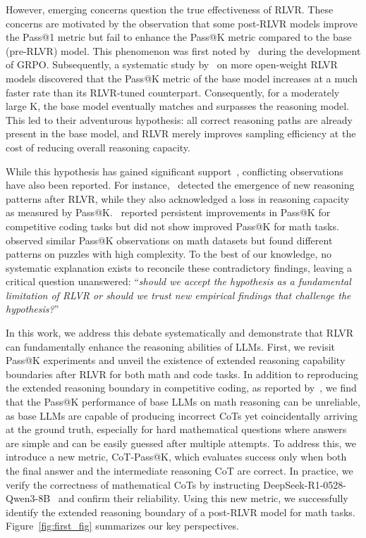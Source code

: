 However, emerging concerns question the true effectiveness of RLVR. These concerns are motivated by the observation that some post-RLVR models improve the Pass@1 metric but fail to enhance the Pass@K metric compared to the base (pre-RLVR) model. This phenomenon was first noted by~\cite{shao2024deepseekmath} during the development of GRPO. Subsequently, a systematic study by~\cite{yue2025RLVR_limit} on more open-weight RLVR models discovered that the Pass@K metric of the base model increases at a much faster rate than its RLVR-tuned counterpart. Consequently, for a moderately large K, the base model eventually matches and surpasses the reasoning model. This led to their adventurous hypothesis: all correct reasoning paths are already present in the base model, and RLVR merely improves sampling efficiency at the cost of reducing overall reasoning capacity.

While this hypothesis has gained significant support~\citep{zhu2025PosNegRLVR,zhang2025EMPO,wang2025MultimodalCoTRM,chen2025NFT}, conflicting observations have also been reported. For instance,~\cite{liu2025ProRL} detected the emergence of new reasoning patterns after RLVR, while they also acknowledged a loss in reasoning capacity as measured by Pass@K.~\cite{chen2025AceReason-Nemotron} reported persistent improvements in Pass@K for competitive coding tasks but did not show improved Pass@K for math tasks.~\cite{Shojaee2025IllusionOfThink} observed similar Pass@K observations on math datasets but found different patterns on puzzles with high complexity.
To the best of our knowledge, no systematic explanation exists to reconcile these contradictory findings, leaving a critical question unanswered: ``\emph{should we accept the hypothesis as a fundamental limitation of RLVR or should we trust new empirical findings that challenge the hypothesis?}''

In this work, we address this debate systematically and demonstrate that RLVR can fundamentally enhance the reasoning abilities of LLMs.
First, we revisit Pass@K experiments and unveil the existence of extended reasoning capability boundaries after RLVR for both math and code tasks.  
In addition to reproducing the extended reasoning boundary in competitive coding, as reported by~\citet{chen2025AceReason-Nemotron}, we find that the Pass@K performance of base LLMs on math reasoning can be unreliable, as base LLMs are capable of producing incorrect CoTs yet coincidentally arriving at the ground truth, especially for hard mathematical questions where answers are simple and can be easily guessed after multiple attempts.
To address this, we introduce a new metric, CoT-Pass@K, which evaluates success only when both the final answer and the intermediate reasoning CoT are correct.  
In practice, we verify the correctness of mathematical CoTs by instructing DeepSeek-R1-0528-Qwen3-8B~\citep{deepseek2025R1-0528} and confirm their reliability.
Using this new metric, we successfully identify the extended reasoning boundary of a post-RLVR model for math tasks.  
Figure~\ref{fig:first_fig} summarizes our key perspectives.


